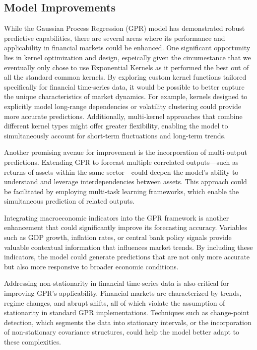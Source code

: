 \subsection{Model Improvements}
While the Gaussian Process Regression (GPR) model has demonstrated robust predictive capabilities, there are several areas where its performance and applicability in financial markets could be enhanced. 
One significant opportunity lies in kernel optimization and design, espeically given the circumestance that we eventually only chose to use Exponential Kernels as it performed the best out of all the standard common kernels.
By exploring custom kernel functions tailored specifically for financial time-series data, it would be possible to better capture the unique characteristics of market dynamics. 
For example, kernels designed to explicitly model long-range dependencies or volatility clustering could provide more accurate predictions. 
Additionally, multi-kernel approaches that combine different kernel types might offer greater flexibility, enabling the model to simultaneously account for short-term fluctuations and long-term trends.

Another promising avenue for improvement is the incorporation of multi-output predictions. 
Extending GPR to forecast multiple correlated outputs—such as returns of assets within the same sector—could deepen the model's ability to understand and leverage interdependencies between assets. 
This approach could be facilitated by employing multi-task learning frameworks, which enable the simultaneous prediction of related outputs.

Integrating macroeconomic indicators into the GPR framework is another enhancement that could significantly improve its forecasting accuracy. 
Variables such as GDP growth, inflation rates, or central bank policy signals provide valuable contextual information that influences market trends. 
By including these indicators, the model could generate predictions that are not only more accurate but also more responsive to broader economic conditions.

Addressing non-stationarity in financial time-series data is also critical for improving GPR's applicability. 
Financial markets are characterized by trends, regime changes, and abrupt shifts, all of which violate the assumption of stationarity in standard GPR implementations. 
Techniques such as change-point detection, which segments the data into stationary intervals, or the incorporation of non-stationary covariance structures, could help the model better adapt to these complexities.


